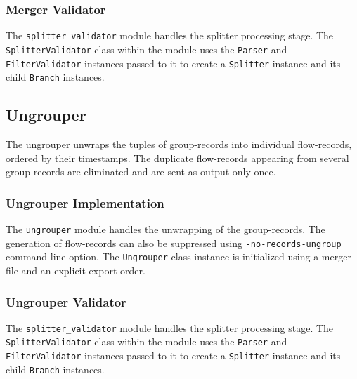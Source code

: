 \subsubsection{Merger Validator}\label{subsubsec:merger-validator}
The \texttt{splitter\_validator} module handles the splitter processing stage.
The \texttt{SplitterValidator} class within the module uses the \texttt{Parser} and \texttt{FilterValidator} instances passed to it to create a \texttt{Splitter} instance and its child \texttt{Branch} instances.

\subsection{Ungrouper}\label{subsec:ungrouper}
The ungrouper unwraps the tuples of group-records into individual flow-records, ordered by their timestamps. The duplicate flow-records appearing from several group-records are eliminated and are sent as output only once. 

\subsubsection{Ungrouper Implementation}\label{subsubsec:ungrouper-impl}
The \texttt{ungrouper} module handles the unwrapping of the group-records. The generation of flow-records can also be suppressed using \texttt{-no-records-ungroup} command line option. The \texttt{Ungrouper} class instance is initialized using a merger file and an explicit export order.

\subsubsection{Ungrouper Validator}\label{subsubsec:ungrouper-validator}
The \texttt{splitter\_validator} module handles the splitter processing stage.
The \texttt{SplitterValidator} class within the module uses the \texttt{Parser} and \texttt{FilterValidator} instances passed to it to create a \texttt{Splitter} instance and its child \texttt{Branch} instances.
